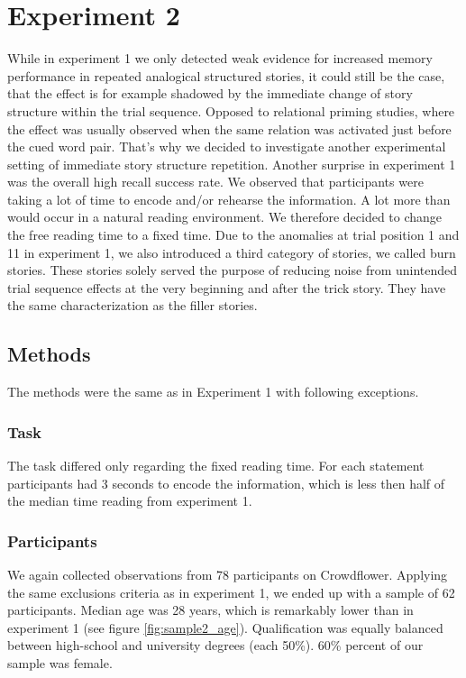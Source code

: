 \documentclass[a4paper,man,natbib,floatsintext,import]{apa6}
\begin{document}
\section{Experiment 2}
While in experiment 1 we only detected weak evidence for increased memory performance in repeated analogical structured stories, it could still be the case, that the effect is for example shadowed by the immediate change of story structure within the trial sequence. Opposed to relational priming studies, where the effect was usually observed when the same relation was activated just before the cued word pair. That's why we decided to investigate another experimental setting of immediate story structure repetition.
Another surprise in experiment 1 was the overall high recall success rate. We observed that participants were taking a lot of time to encode and/or rehearse the information. A lot more than would occur in a natural reading environment. We therefore decided to change the free reading time to a fixed time.
Due to the anomalies at trial position 1 and 11 in experiment 1, we also introduced a third category of stories, we called burn stories. These stories solely served the purpose of reducing noise from unintended trial sequence effects at the very beginning and after the trick story. They have the same characterization as the filler stories.

\subsection{Methods}
The methods were the same as in Experiment 1 with following exceptions.

\subsubsection{Task}
The task differed only regarding the fixed reading time. For each statement participants had 3 seconds to encode the information, which is less then half of the median time reading from experiment 1.

\subsubsection{Participants}
We again collected observations from 78 participants on Crowdflower. Applying the same exclusions criteria as in experiment 1, we ended up with a sample of 62 participants. Median age was 28 years, which is remarkably lower than in experiment 1 (see figure \ref{fig:sample2_age}). Qualification was equally balanced between high-school and university degrees (each 50\%). 60\% percent of our sample was female.
\end{document}
